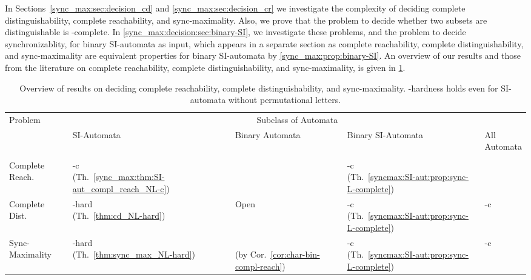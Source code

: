 
In Sections~\ref{sync_max:sec:decision_cd} and \ref{sync_max:sec:decision_cr}
we investigate the complexity of deciding complete distinguishability, complete reachability,
and sync-maximality. 
Also, we prove that the problem to decide whether two subsets are distinguishable is \PSPACE-complete.
In \cref{sync_max:decision:sec:binary-SI}, 
we investigate these problems, and the problem to decide synchronizablity,
for binary SI-automata as input,
which appears in a separate section as  
complete reachability, complete distinguishability, and sync-maximality
are equivalent properties for binary SI-automata by \cref{sync_max:prop:binary-SI}.
An overview of our results and those from the literature on complete reachability, complete distinguishability, and sync-maximality,
is given in \cref{tab:complexity}.

\begin{table}[htb]
	\centering    
	\caption[Overview decision problems]{Overview of results on deciding
		complete reachability, complete distinguishability, and sync-maximality.
		\NL-hardness holds even for SI-automata without permutational letters.}
	\begin{tabular}{*{5}{l}}
		\toprule
		\multirow{2}{*}{Problem} & \multicolumn{4}{c}{Subclass of Automata} \\
		\cmidrule(lr){2-5}
		& SI-Automata & \parbox{1.9cm}{Binary Automata} & \parbox{1.9cm}{Binary SI-Automata} & \parbox{1.9cm}{All \\ Automata} \\  
		\midrule 
		\\ [-1.5ex] 
		Complete Reach. & \parbox{1.8cm}{\NL-c \\ (Th.~\ref{sync_max:thm:SI-aut_compl_reach_NL-c})} & \parbox{1.5cm}{ \PTIME \\ \cite{DBLP:conf/latin/CasasV22}} & \parbox{1.8cm}{\LOGSPACE-c \\ (Th.~\ref{syncmax:SI-aut:prop:sync-L-complete})}  & \parbox{1.5cm}{\PTIME \\ \cite{DBLP:conf/icalp/FerensS23}}  \\ [2.5ex] 
		Complete Dist. & \parbox{1.8cm}{\NL-hard \\ (Th.~\ref{thm:cd_NL-hard})} & Open & \parbox{1.8cm}{\LOGSPACE-c \\ (Th.~\ref{syncmax:SI-aut:prop:sync-L-complete})} & \parbox{1.9cm}{\PSPACE-c \\ \cite{SzykulaZyzik24}}  \\ [2.5ex] 
		Sync-Maximality & \parbox{1.8cm}{\NL-hard \\ (Th.~\ref{thm:sync_max_NL-hard})} & \parbox{2.7cm}{\PTIME \\ (by Cor.~\ref{cor:char-bin-compl-reach})}   & \parbox{1.8cm}{\LOGSPACE-c \\ (Th.~\ref{syncmax:SI-aut:prop:sync-L-complete})} & \parbox{1.9cm}{\PSPACE-c \\ \cite{SzykulaZyzik24}}   \\  [2.5ex] 
		\bottomrule
	\end{tabular} %
	\label{tab:complexity}
\end{table}

